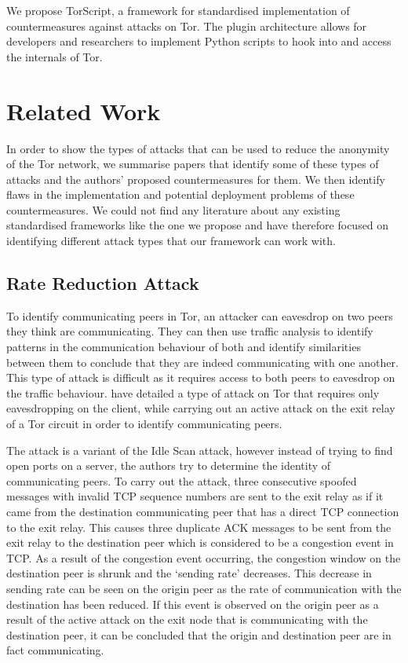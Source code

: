 \documentclass[9pt,technote]{IEEEtran}
\begin{document}
We propose TorScript, a framework for standardised implementation of
countermeasures against attacks on Tor. The plugin architecture allows for
developers and researchers to implement Python scripts to hook into and access
the internals of Tor.

\section{Related Work} 
\label{sec:relatedwork}
In order to show the types of attacks that can be used to reduce the anonymity of the Tor network, we summarise papers that identify some of these types of attacks and the authors' proposed countermeasures for them. We then identify flaws in the implementation and potential deployment problems of these countermeasures. We could not find any literature about any existing standardised frameworks like the one we propose and have therefore focused on identifying different attack types that our framework can work with.\\

\subsection{Rate Reduction Attack}
To identify communicating peers in Tor, an attacker can eavesdrop on two peers they think are communicating. They can then use traffic analysis to identify patterns in the communication behaviour of both and identify similarities between them to conclude that they are indeed communicating with one another. This type of attack is difficult as it requires access to both peers to eavesdrop on the traffic behaviour. \citeauthor{gilad2012spying} have detailed a type of attack on Tor that requires only eavesdropping on the client, while carrying out an active attack on the exit relay of a Tor circuit in order to identify communicating peers.

The attack is a variant of the Idle Scan attack, however instead of trying to find open ports on a server, the authors try to determine the identity of communicating peers. To carry out the attack, three consecutive spoofed messages with invalid TCP sequence numbers are sent to the exit relay as if it came from the destination communicating peer that has a direct TCP connection to the exit relay. This causes three duplicate ACK messages to be sent from the exit relay to the destination peer which is considered to be a congestion event in TCP. As a result of the congestion event occurring, the congestion window on the destination peer is shrunk and the `sending rate' decreases. This decrease in sending rate can be seen on the origin peer as the rate of communication with the destination has been reduced. If this event is observed on the origin peer as a result of the active attack on the exit node that is communicating with the destination peer, it can be concluded that the origin and destination peer are in fact communicating.
\end{document}
